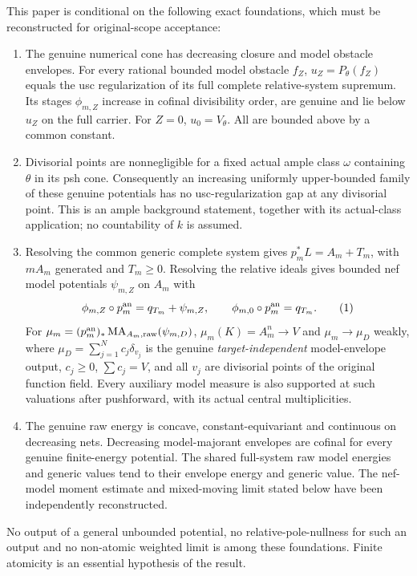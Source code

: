 \documentclass[10pt]{article}
\newcommand{\MA}{\operatorname{MA}}
\begin{document}
This paper is conditional on the following exact foundations, which
must be reconstructed for original-scope acceptance:
\begin{enumerate}
\item The genuine numerical cone has decreasing closure and model
obstacle envelopes. For every rational bounded model obstacle $f_Z$,
$u_Z=P_\theta(f_Z)$ equals the usc regularization of its full complete
relative-system supremum. Its stages $\phi_{m,Z}$ increase in cofinal
divisibility order, are genuine and lie below $u_Z$ on the full carrier.
For $Z=0$, $u_0=V_\theta$. All are bounded above by a common constant.
\item Divisorial points are nonnegligible for a fixed actual ample
class $\omega$ containing $\theta$ in its psh cone. Consequently an
increasing uniformly upper-bounded family of these genuine potentials
has no usc-regularization gap at any divisorial point. This is an ample
background statement, together with its actual-class application;
no countability of $k$ is assumed.
\item Resolving the common generic complete system gives
$p_m^*L=A_m+T_m$, with $mA_m$ generated and $T_m\ge0$. Resolving the
relative ideals gives bounded nef model potentials $\psi_{m,Z}$ on
$A_m$ with
\[
 \phi_{m,Z}\circ p_m^{\rm an}=q_{T_m}+\psi_{m,Z},\qquad
 \phi_{m,0}\circ p_m^{\rm an}=q_{T_m}.
 \tag{1}
\]
For $\mu_m=(p_m^{\rm an})_*\MA_{A_m,\rm raw}(\psi_{m,D})$,
$\mu_m(K)=A_m^n\to V$ and $\mu_m\to\mu_D$ weakly, where
$\mu_D=\sum_{j=1}^N c_j\delta_{v_j}$ is the genuine
\emph{target-independent} model-envelope output, $c_j\ge0$,
$\sum c_j=V$, and all $v_j$ are divisorial points of the original
function field. Every auxiliary model measure is also supported at
such valuations after pushforward, with its actual central multiplicities.
\item The genuine raw energy is concave, constant-equivariant and
continuous on decreasing nets. Decreasing model-majorant envelopes are
cofinal for every genuine finite-energy potential. The shared full-system
raw model energies and generic values tend to their envelope energy and
generic value. The nef-model moment estimate and mixed-moving limit
stated below have been independently reconstructed.
\end{enumerate}
No output of a general unbounded potential, no relative-pole-nullness
for such an output and no non-atomic weighted limit is among these
foundations. Finite atomicity is an essential hypothesis of the result.
\end{document}
